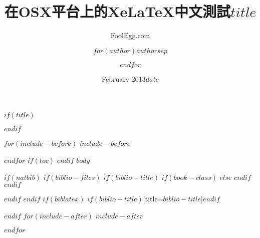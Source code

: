 \documentclass[$if(fontsize)$$fontsize$,$endif$$if(lang)$$lang$,$endif$$if(papersize)$$papersize$,$endif$]{$documentclass$}
\title{\huge 在OSX平台上的XeLaTeX中文測試} %
\author{FoolEgg.com} 		%
\date{February 2013} 		%
\title{$title$}
\author{$for(author)$$author$$sep$ \and $endfor$}
\date{$date$}
\begin{document}
$if(title)$
\maketitle
$endif$

$for(include-before)$
$include-before$

$endfor$
$if(toc)$
{
\hypersetup{linkcolor=black}
\setcounter{tocdepth}{$toc-depth$}
\tableofcontents
}
$endif$
$body$

$if(natbib)$
$if(biblio-files)$
$if(biblio-title)$
$if(book-class)$
\renewcommand\bibname{$biblio-title$}
$else$
\renewcommand\refname{$biblio-title$}
$endif$
$endif$


$endif$
$endif$
$if(biblatex)$
\printbibliography$if(biblio-title)$[title=$biblio-title$]$endif$

$endif$
$for(include-after)$
$include-after$

$endfor$
\end{document}
